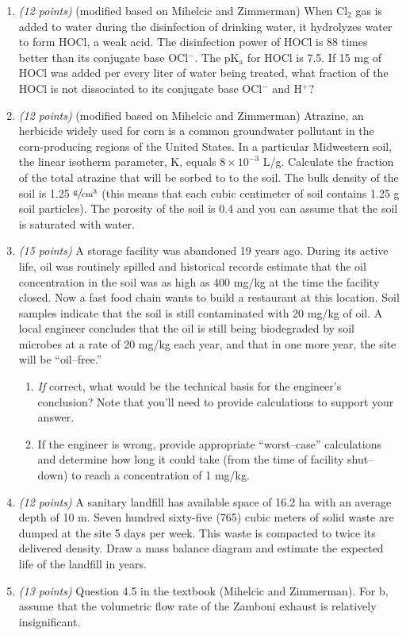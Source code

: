 \documentclass[12pt,letterpaper]{article}
\begin{document}
\begin{enumerate}
\item \emph{(12 points)} (modified based on Mihelcic and Zimmerman) When Cl$_2$ gas is added to water during the disinfection of drinking water, it hydrolyzes water to form HOCl, a weak acid. The disinfection power of HOCl is 88 times better than its conjugate base OCl$^-$.  The pK$\mathrm{_a}$ for HOCl is 7.5.  If 15 mg of HOCl was added per every liter of water being treated, what fraction of the HOCl is not dissociated to its conjugate base OCl$^-$ and H$^+$?

\item \emph{(12 points)} (modified based on Mihelcic and Zimmerman) Atrazine, an herbicide widely used for corn is a common groundwater pollutant in the corn-producing regions of the United States.  In a particular Midwestern soil, the linear isotherm parameter, K, equals $8\times 10^{-3}$ L/g.  Calculate the fraction of the total atrazine that will be sorbed to to the soil.  The bulk density of the soil is 1.25 $\mathrm{\sfrac{g}{cm^3}}$ (this means that each cubic centimeter of soil contains 1.25 g soil particles).  The porosity of the soil is 0.4 and you can assume that the soil is saturated with water.

\item \emph{(15 points)} A storage facility was abandoned 19 years ago.  During its active life, oil was routinely spilled and historical records estimate that the oil concentration in the soil was as high as 400 mg/kg at the time the facility closed.  Now a fast food chain wants to build a restaurant at this location.  Soil samples indicate that the soil is still contaminated with 20 mg/kg of oil.  A local engineer concludes that the oil is still being biodegraded by soil microbes at a rate of 20 mg/kg each year, and that in one more year, the site will be ``oil--free.''

\begin{enumerate}
\item \emph{If} correct, what would be the technical basis for the engineer's conclusion? Note that you'll need to provide calculations to support your answer.
\item If the engineer is wrong, provide appropriate ``worst--case'' calculations and determine how long it could take (from the time of facility shut--down) to reach a concentration of 1 mg/kg.
\end{enumerate}

\item \emph{(12 points)} A sanitary landfill has available space of 16.2 ha with an average depth of 10 m.  Seven hundred sixty-five (765) cubic meters of solid waste are dumped at the site 5 days per week.  This waste is compacted to twice its delivered density. Draw a mass balance diagram and estimate the expected life of the landfill in years.

\item \emph{(13 points)} Question 4.5 in the textbook (Mihelcic and Zimmerman).  For b, assume that the volumetric flow rate of the Zamboni exhaust is relatively insignificant.

 
\end{enumerate}
\end{document}
